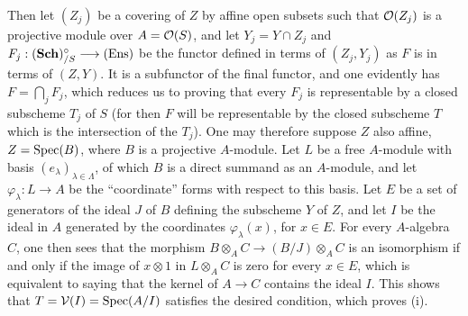 Then let $(Z_j)$ be a covering of $Z$ by affine open subsets such that $\mathcal{O}(Z_j)$ is a projective module over $A=\mathcal{O}(S)$, and let $Y_j=Y\cap Z_j$ and $F_j:(\mathbf{Sch})^\circ_{/S}\longrightarrow\textup{(Ens)}$ be the functor defined in terms of $(Z_j,Y_j)$ as $F$ is in terms of $(Z,Y)$. It is a subfunctor of the final functor, and one evidently has $F=\bigcap_jF_j$, which reduces us to proving that every $F_j$ is representable by a closed subscheme $T_j$ of $S$ (for then $F$ will be representable by the closed subscheme $T$ which is the intersection of the $T_j$). One may therefore suppose $Z$ also affine, $Z=\operatorname{Spec}(B)$, where $B$ is a projective $A$-module. Let $L$ be a free $A$-module with basis $(e_\lambda)_{\lambda\in\Lambda}$, of which $B$ is a direct summand as an $A$-module, and let $\varphi_\lambda:L\to A$ be the ``coordinate'' forms with respect to this basis. Let $E$ be a set of generators of the ideal $J$ of $B$ defining the subscheme $Y$ of $Z$, and let $I$ be the ideal in $A$ generated by the coordinates $\varphi_\lambda(x)$, for $x\in E$. For every $A$-algebra $C$, one then sees that the morphism $B\otimes_AC\to(B/J)\otimes_AC$ is an isomorphism if and only if the image of $x\otimes1$ in $L\otimes_AC$ is zero for every $x\in E$, which is equivalent to saying that the kernel of $A\to C$ contains the ideal $I$. This shows that $T=\mathcal V(I)=\operatorname{Spec}(A/I)$ satisfies the desired condition, which proves (i).

